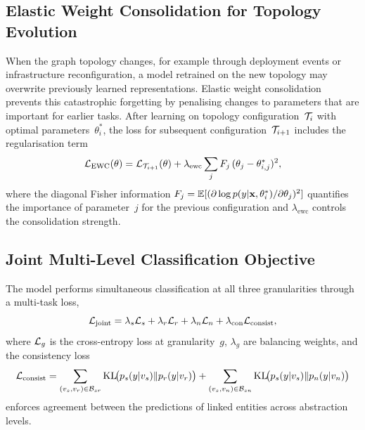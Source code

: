 \subsection{Elastic Weight Consolidation for Topology Evolution}

When the graph topology changes, for example through deployment events or infrastructure reconfiguration, a model retrained on the new topology may overwrite previously learned representations. Elastic weight consolidation~\cite{Kirkpatrick2017,Zenke2017} prevents this catastrophic forgetting by penalising changes to parameters that are important for earlier tasks. After learning on topology configuration~$\mathcal{T}_i$ with optimal parameters~$\theta_i^*$, the loss for subsequent configuration~$\mathcal{T}_{i+1}$ includes the regularisation term
\begin{equation}
\mathcal{L}_{\mathrm{EWC}}(\theta)
= \mathcal{L}_{\mathcal{T}_{i+1}}(\theta)
  + \lambda_{\mathrm{ewc}}\sum_j F_j\,(\theta_j - \theta_{i,j}^*)^2,
\label{eq:ewc}
\end{equation}
where the diagonal Fisher information $F_j = \mathbb{E}[(\partial\log p(y|\mathbf{x},\theta_i^*)/\partial\theta_j)^2]$ quantifies the importance of parameter~$j$ for the previous configuration and $\lambda_{\mathrm{ewc}}$ controls the consolidation strength.

\subsection{Joint Multi-Level Classification Objective}

The model performs simultaneous classification at all three granularities through a multi-task loss,\begin{equation}
\mathcal{L}_{\mathrm{joint}}
= \lambda_s\mathcal{L}_s + \lambda_r\mathcal{L}_r + \lambda_n\mathcal{L}_n
  + \lambda_{\mathrm{con}}\mathcal{L}_{\mathrm{consist}},
\label{eq:triple_joint}
\end{equation}
where $\mathcal{L}_g$ is the cross-entropy loss at granularity~$g$, $\lambda_g$ are balancing weights, and the consistency loss
\begin{equation}
\mathcal{L}_{\mathrm{consist}}
= \sum_{(v_s,v_r)\in\mathcal{B}_{sr}}
  \mathrm{KL}\!\bigl(p_s(y|v_s)\|p_r(y|v_r)\bigr)
+ \sum_{(v_s,v_n)\in\mathcal{B}_{sn}}
  \mathrm{KL}\!\bigl(p_s(y|v_s)\|p_n(y|v_n)\bigr)
\label{eq:triple_consist}
\end{equation}enforces agreement between the predictions of linked entities across abstraction levels.


